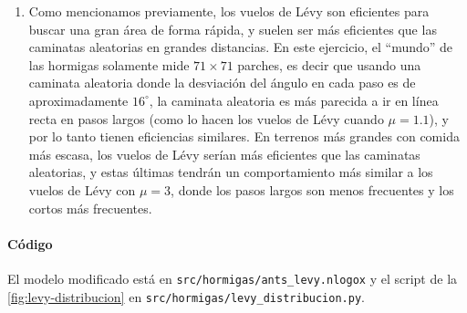 \begin{solucion}
\begin{enumerate}
  \item Como mencionamos previamente, los vuelos de Lévy son eficientes para buscar una gran área de forma rápida,
  y suelen ser más eficientes que las caminatas aleatorias en grandes distancias. En este ejercicio, el ``mundo'' de
  las hormigas solamente mide $71 \times 71$ parches, es decir que usando una caminata aleatoria donde la desviación del
  ángulo en cada paso es de aproximadamente $16^\circ$, la caminata aleatoria es más parecida a ir en línea recta en pasos
  largos (como lo hacen los vuelos de Lévy cuando $\mu = 1.1$), y por lo tanto tienen eficiencias similares. En
  terrenos más grandes con comida más escasa, los vuelos de Lévy serían más eficientes que las caminatas aleatorias,
  y estas últimas tendrán un comportamiento más similar a los vuelos de Lévy con $\mu = 3$, donde los pasos 
  largos son menos frecuentes y los cortos más frecuentes.

\end{enumerate}

\paragraph{Código}
El modelo modificado está en \texttt{src/hormigas/ants\_levy.nlogox} y el script de la
\cref{fig:levy-distribucion} en \texttt{src/hormigas/levy\_distribucion.py}.
\end{solucion}
